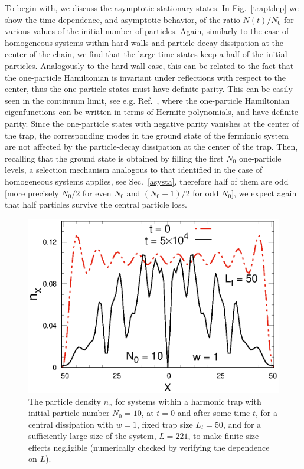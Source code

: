   
  To begin with, we discuss the asymptotic stationary states.  In
  Fig.~\ref{traptdep} we show the time dependence, and asymptotic
  behavior, of the ratio $N(t)/N_0$ for various values of the initial
  number of particles. Again, similarly to the case of homogeneous
  systems within hard walls and particle-decay dissipation at the center
  of the chain, we find that the large-time states keep a half of the
  initial particles.  Analogously to the hard-wall case, this can be
  related to the fact that the one-particle Hamiltonian is invariant
  under reflections with respect to the center, thus the one-particle
  states must have definite parity. This can be easily seen in the
  continuum limit, see e.g. Ref.~\cite{ACV-14}, where the one-particle
  Hamiltonian eigenfunctions can be written in terms of Hermite
  polynomials, and have definite parity.  Since the one-particle states
  with negative parity vanishes at the center of the trap, the
  corresponding modes in the ground state of the fermionic system are
  not affected by the particle-decay dissipation at the center of the
  trap. Then, recalling that the ground state is obtained by filling the
  first $N_0$ one-particle levels, a selection mechanism analogous to
  that identified in the case of homogeneous systems applies, see
  Sec.~\ref{asysta}, therefore half of them are odd [more precisely
    $N_0/2$ for even $N_0$ and $(N_0-1)/2$ for odd $N_0$], we expect
  again that half particles survive the central particle loss.
  
  \begin{figure}[!htb]
\centering
  \includegraphics[width=0.65\columnwidth]{imm/trapnxLt50.eps}
  \caption{The particle density $n_x$ for systems within a harmonic trap
    with initial particle number $N_0=10$, at $t=0$ and after some time
    $t$, for a central dissipation with $w=1$, fixed trap size $L_t=50$,
    and for a sufficiently large size of the system, $L=221$, to make
    finite-size effects negligible (numerically checked by verifying the
    dependence on $L$).}
  \label{trapnxt}
  \end{figure}
  
